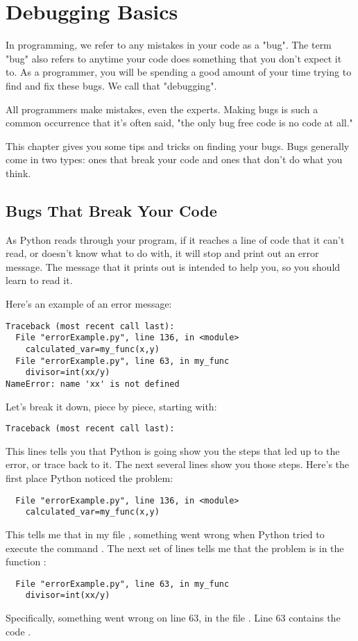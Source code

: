 \chapter{Debugging Basics}
\label{chap:debug}
In programming, we refer to any mistakes in your code as a "bug". The term "bug" also refers to anytime your code does something that you don't expect it to.  As a programmer, you will be spending a good amount of your time trying to find and fix these bugs.  We call that "debugging".

All programmers make mistakes, even the experts.  Making bugs is such a common occurrence that it's often said, "the only bug free code is no code at all."

This chapter gives you some tips and tricks on finding your bugs.  Bugs generally come in two types: ones that break your code and ones that don't do what you think.


\section{Bugs That Break Your Code}
As Python reads through your program, if it reaches a line of code that it can't read, or doesn't know what to do with, it will stop and print out an error message.  The message that it prints out is intended to help you, so you should learn to read it.

Here's an example of an error message:
\begin{Verbatim}
Traceback (most recent call last):
  File "errorExample.py", line 136, in <module>
    calculated_var=my_func(x,y)
  File "errorExample.py", line 63, in my_func
    divisor=int(xx/y)
NameError: name 'xx' is not defined
\end{Verbatim}
Let's break it down, piece by piece, starting with:
\begin{Verbatim}
Traceback (most recent call last):
\end{Verbatim}
This lines tells you that Python is going show you the steps that led up to the error, or trace back to it.  The next several lines show you those steps.  Here's the first place Python noticed the problem:
\begin{Verbatim}
  File "errorExample.py", line 136, in <module>
    calculated_var=my_func(x,y)
\end{Verbatim}
This tells me that in my file , something went wrong when Python tried to execute the command .  The next set of lines tells me that the problem is in the function :
\begin{Verbatim}
  File "errorExample.py", line 63, in my_func
    divisor=int(xx/y)
\end{Verbatim}
Specifically, something went wrong on line 63, in the file . Line 63 contains the code .

